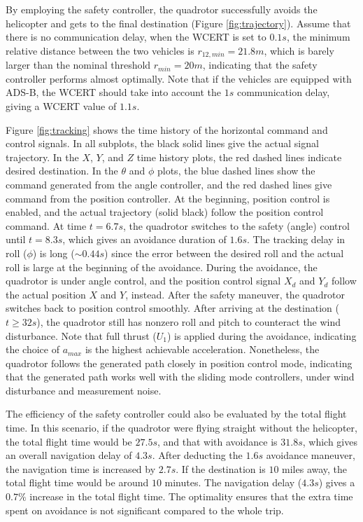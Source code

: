 \documentclass[journal,11pt,onecolumn,draftclsnofoot,]{IEEEtran}
\begin{document}
By employing the safety controller, the quadrotor successfully avoids the helicopter and gets to the final destination (Figure \ref{fig:trajectory}). Assume that there is no communication delay, when the WCERT is set to $0.1s$, the minimum relative distance between the two vehicles is $r_{12,min}=21.8m$, which is barely larger than the nominal threshold $r_{min}=20m$, indicating that the safety controller performs almost optimally. Note that if the vehicles are equipped with ADS-B, the WCERT should take into account the $1s$ communication delay, giving a WCERT value of $1.1s$.

Figure \ref{fig:tracking} shows the time history of the horizontal command and control signals. In all subplots, the black solid lines give the actual signal trajectory. In the $X$, $Y$, and $Z$ time history plots, the red dashed lines indicate desired destination. In the $\theta$ and $\phi$ plots, the blue dashed lines show the command generated from the angle controller, and the red dashed lines give command from the position controller. At the beginning, position control is enabled, and the actual trajectory (solid black) follow the position control command. At time $t=6.7s$, the quadrotor switches to the safety (angle) control until $t=8.3s$, which gives an avoidance duration of $1.6s$. The tracking delay in roll ($\phi$) is long ($\sim 0.44s$) since the error between the desired roll and the actual roll is large at the beginning of the avoidance. During the avoidance, the quadrotor is under angle control, and the position control signal $X_d$ and $Y_d$ follow the actual position $X$ and $Y$, instead. After the safety maneuver, the quadrotor switches back to position control smoothly. After arriving at the destination ($t \ge 32 s$), the quadrotor still has nonzero roll and pitch to counteract the wind disturbance. Note that full thrust ($U_1$) is applied during the avoidance, indicating the choice of $a_{max}$ is the highest achievable acceleration. Nonetheless, the quadrotor follows the generated path closely in position control mode, indicating that the generated path works well with the sliding mode controllers, under wind disturbance and measurement noise.

The efficiency of the safety controller could also be evaluated by the total flight time. In this scenario, if the quadrotor were flying straight without the helicopter, the total flight time would be $27.5 s$, and that with avoidance is $31.8 s$, which gives an overall navigation delay of $4.3 s$. After deducting the $1.6 s$ avoidance maneuver, the navigation time is increased by $2.7 s$. If the destination is $10$ miles away, the total flight time would be around $10$ minutes. The navigation delay ($4.3 s$) gives a $0.7\%$ increase in the total flight time. The optimality ensures that the extra time spent on avoidance is not significant compared to the whole trip.
\end{document}
